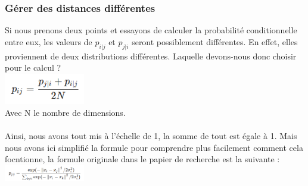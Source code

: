             
            \subsubsection*{Gérer des distances différentes}
            Si nous prenons deux points et essayons de calculer la probabilité conditionnelle entre eux, les valeurs de $p_{i|j}$ et $p_{j|i}$ seront possiblement différentes. En effet, elles proviennent de deux distributions différentes. Laquelle devons-nous donc choisir pour le calcul ?
            \\
            \includegraphics[width=100pt]{./img/reduction_dim/t_sne/eq_prob_2.png}
            \\
            Avec N le nombre de dimensions.
            \\
            \\
            Ainsi, nous avons tout mis à l'échelle de 1, la somme de tout est égale à 1. Mais nous avons ici simplifié la formule pour comprendre plus facilement comment cela focntionne, la formule originale dans le papier de recherche est la suivante : 
            \\
            \includegraphics[width=100pt]{./img/reduction_dim/t_sne/eq_prob_3.png}
            \\







